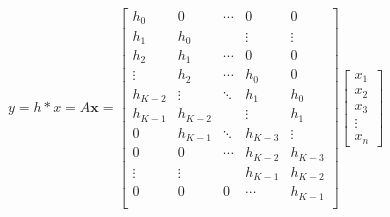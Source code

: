 \[
y=h*x=A\mathbf{x} = \begin{bmatrix}
h_0&0&\cdots&0&0\\
h_1&h_0&&\vdots&\vdots\\
h_2&h_1&\cdots&0&0\\
\vdots&h_2&\cdots&h_0&0\\
h_{K-2}&\vdots&\ddots&h_1&h_0\\
h_{K-1}&h_{K-2}&&\vdots&h_1\\
0&h_{K-1}&\ddots&h_{K-3}&\vdots
\\0&0&\cdots&h_{K-2}&h_{K-3}\\
\vdots&\vdots&&h_{K-1}&h_{K-2}\\
0&0&0&\cdots&h_{K-1}\\
\end{bmatrix}\begin{bmatrix}x_1\\x_2\\x_3\\\vdots\\x_n\end{bmatrix}
\]



